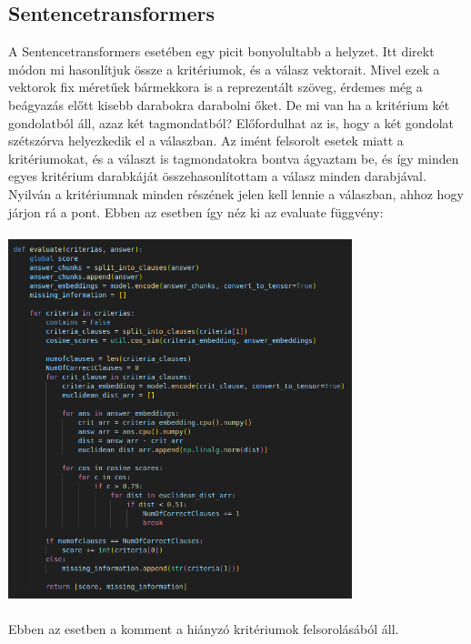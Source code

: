 \documentclass{article}
\begin{document}
\subsection{Sentencetransformers}

A Sentencetransformers esetében egy picit bonyolultabb a helyzet. Itt direkt módon mi hasonlítjuk össze a kritériumok, és a válasz vektorait. 
Mivel ezek a vektorok fix méretűek bármekkora is a reprezentált szöveg, érdemes még a beágyazás előtt kisebb darabokra darabolni őket. De mi van ha a kritérium két gondolatból áll,
azaz két tagmondatból? Előfordulhat az is, hogy a két gondolat szétszórva helyezkedik el a válaszban. Az imént felsorolt esetek miatt a kritériumokat, és a választ is tagmondatokra bontva ágyaztam be, és így minden egyes 
kritérium darabkáját összehasonlítottam a válasz minden darabjával. Nyilván a kritériumnak minden részének jelen kell lennie a válaszban, ahhoz hogy járjon rá a pont.
Ebben az esetben így néz ki az evaluate függvény:
\\
\\
\includegraphics[width=10cm]{eval.png}
\\
\\
\indent Ebben az esetben a komment a hiányzó kritériumok felsorolásából áll.
\end{document}
